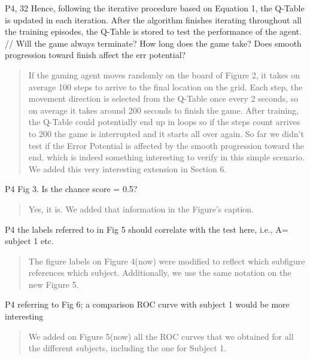 \documentclass[journal,onecolumn,12pt]{IEEEtran}
\begin{document}
P4, 32 Hence, following the iterative procedure based on Equation 1, the Q-Table is updated in each iteration. After the algorithm finishes iterating throughout all the training episodes, the Q-Table is stored to test the performance of the agent.
// Will the game always terminate? How long does the game take? Does smooth progression toward finish affect the err potential?

\vspace{2em}
\begin{quotation}
{\color{blue}

If the gaming agent moves randomly on the board of Figure 2, it takes on average 100 steps to arrive to the final location on the grid.  Each step, the movement direction is selected from the Q-Table once every 2 seconds, so on average it takes around 200 seconds to finish the game.  After training, the Q-Table could potentially end up in loops so if the steps count arrives to 200 the game is interrupted and it starts all over again.
So far we didn't test if the Error Potential is affected by the smooth progression toward the end, which is indeed something interesting to verify in this simple scenario.  We added this very interesting extension in Section 6.

}
\end{quotation}
\vspace{2em}

P4 Fig 3. Is the chance score = 0.5?

\vspace{2em}
\begin{quotation}
{\color{blue}
Yes, it is.  We added that information in the Figure's caption.
}
\end{quotation}
\vspace{2em}

P4 the labels referred to in Fig 5 should correlate with the test here, i.e., A= subject 1 etc.

\vspace{2em}
\begin{quotation}
{\color{blue}
The figure labels on Figure 4(now) were modified to reflect which subfigure references which subject.  Additionally, we use the same notation on the new Figure 5.
} 
\end{quotation}
\vspace{2em}

P4 referring to Fig 6; a comparison ROC curve with subject 1 would be more interesting

\vspace{2em}
\begin{quotation}
{\color{blue}
We added on Figure 5(now) all the ROC curves that we obtained for all the different subjects, including the one for Subject 1.  
}
\end{quotation}
\vspace{2em}
\end{document}
